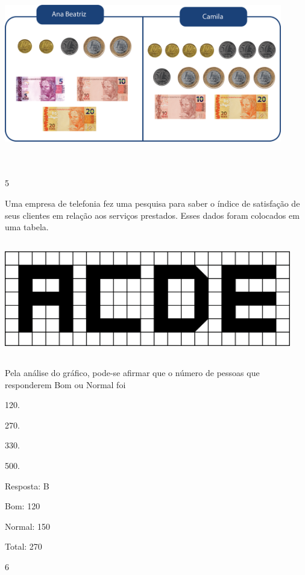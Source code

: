 \begin{multicols}{2}
{\begin{escolha}
{\includegraphics[width=4.76708in,height=3.21695in]{media/image95.png}

\num{5}

Uma empresa de telefonia fez uma pesquisa para saber o índice de
satisfação de seus clientes em relação aos serviços prestados. Esses dados foram
colocados em uma tabela.


\includegraphics[width=4.92543in,height=1.97517in]{media/image96.png}

Pela análise do gráfico, pode-se afirmar que o número de pessoas que
responderem Bom ou Normal foi

\begin{escolha}
\item
  120.
\item
  270.
\item
  330.
\item
  500.
\end{escolha}

Resposta: B

Bom: 120

Normal: 150

Total: 270

\num{6}

}
\end{escolha}}
\end{multicols}
